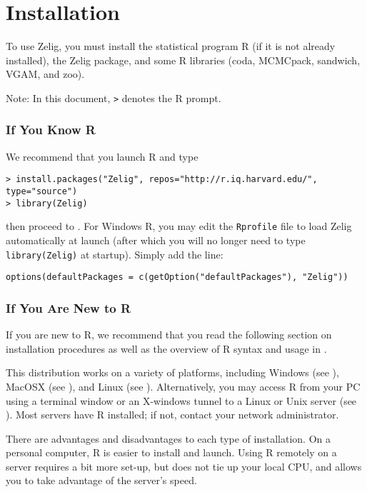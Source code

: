 \section{Installation}

To use Zelig, you must install the statistical program R (if it is not
already installed), the Zelig package, and some R libraries (coda,
MCMCpack, sandwich, VGAM, and zoo).  

Note: In this document, {\tt >} denotes the R prompt.  

\subsubsection{If You Know R} 

We recommend that you launch R and type 
\begin{verbatim}
> install.packages("Zelig", repos="http://r.iq.harvard.edu/", type="source")
> library(Zelig)
\end{verbatim}
then proceed to .  For Windows R, you may edit the 
{\tt Rprofile} file to load Zelig automatically at launch (after which you
will no longer need to type {\tt library(Zelig)} at startup).  Simply
add the line:
\begin{verbatim}
options(defaultPackages = c(getOption("defaultPackages"), "Zelig"))
\end{verbatim}

\subsubsection{If You Are New to R}

If you are new to R, we recommend that you read the following section
on installation procedures as well as the overview of R syntax and
usage in .

This distribution works on a variety of platforms, including Windows
(see ), MacOSX (see ), and Linux (see
).  Alternatively, you may access R from your PC using a
terminal window or an X-windows tunnel to a Linux or Unix server (see
).  Most servers have R installed; if not, contact your
network administrator.

There are advantages and disadvantages to each type of installation.
On a personal computer, R is easier to install and launch.  Using R
remotely on a server requires a bit more set-up, but does not tie up
your local CPU, and allows you to take advantage of the server's speed.

